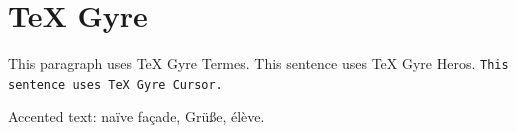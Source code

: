 \documentclass{article}
\begin{document}
\section*{TeX Gyre}
This paragraph uses TeX Gyre Termes. \textsf{This sentence uses TeX Gyre
Heros.} \texttt{This sentence uses TeX Gyre Cursor.}

Accented text: naïve façade, Grüße, élève.
\end{document}
